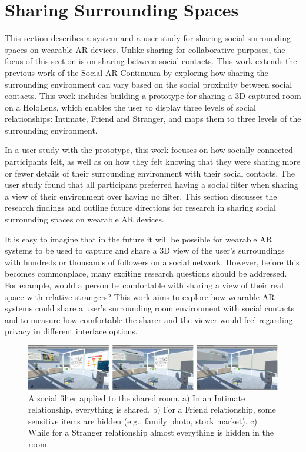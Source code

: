 \section{Sharing Surrounding Spaces}
\label{sec:surrounding:hiding}

This section describes a system and a user study for sharing social surrounding spaces on wearable AR devices. Unlike sharing for collaborative purposes, the focus of this section is on sharing between social contacts. This work extends the previous work of the Social AR Continuum by exploring how sharing the surrounding environment can vary based on the social proximity between social contacts. This work includes building a prototype for sharing a 3D captured room on a HoloLens, which enables the user to display three levels of social relationships: Intimate, Friend and Stranger, and maps them to three levels of the surrounding environment. 

In a user study with the prototype, this work focuses on how socially connected participants felt, as well as on how they felt knowing that they were sharing more or fewer details of their surrounding environment with their social contacts. The user study found that all participant preferred having a social filter when sharing a view of their environment over having no filter. This section discusses the research findings and outline future directions for research in sharing social surrounding spaces on wearable AR devices. 

It is easy to imagine that in the future it will be possible for wearable AR systems to be used to capture and share a 3D view of the user's surroundings with hundreds or thousands of followers on a social network. However, before this becomes commonplace, many exciting research questions should be addressed. For example, would a person be comfortable with sharing a view of their real space with relative strangers? This work aims to explore how wearable AR systems could share a user's surrounding room environment with social contacts and to measure how comfortable the sharer and the viewer would feel regarding privacy in different interface options. 

\begin{figure}
\begin{center}
\includegraphics[width=\linewidth]{images/frontier18/images-02.png}
\caption{A social filter applied to the shared room. a) In an Intimate relationship, everything is shared. b) For a Friend relationship, some sensitive items are hidden (e.g., family photo, stock market). c) While for a Stranger relationship almost everything is hidden in the room.}\label{fig:frontier18:social-filter}
\end{center}
\end{figure}

